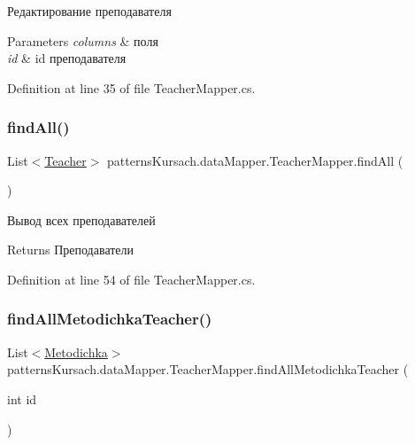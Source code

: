 Редактирование преподавателя 


\begin{DoxyParams}{Parameters}
{\em columns} & поля\\
\hline
{\em id} & id преподавателя\\
\hline
\end{DoxyParams}


Definition at line 35 of file Teacher\+Mapper.\+cs.

\mbox{\label{classpatterns_kursach_1_1data_mapper_1_1_teacher_mapper_ab8781a447f8b22a0ed6a5c52220465be}} 
\subsubsection{\texorpdfstring{find\+All()}{findAll()}}
{\footnotesize\ttfamily List$<$\mbox{\hyperlink{classpatterns_kursach_1_1_teacher}{Teacher}}$>$ patterns\+Kursach.\+data\+Mapper.\+Teacher\+Mapper.\+find\+All (\begin{DoxyParamCaption}{ }\end{DoxyParamCaption})}



Вывод всех преподавателей 

\begin{DoxyReturn}{Returns}
Преподаватели
\end{DoxyReturn}


Definition at line 54 of file Teacher\+Mapper.\+cs.

\mbox{\label{classpatterns_kursach_1_1data_mapper_1_1_teacher_mapper_ab481eae3c59669cdc4e2c51bf25676bb}} 
\subsubsection{\texorpdfstring{find\+All\+Metodichka\+Teacher()}{findAllMetodichkaTeacher()}}
{\footnotesize\ttfamily List$<$\mbox{\hyperlink{classpatterns_kursach_1_1_metodichka}{Metodichka}}$>$ patterns\+Kursach.\+data\+Mapper.\+Teacher\+Mapper.\+find\+All\+Metodichka\+Teacher (\begin{DoxyParamCaption}\item[{int}]{id }\end{DoxyParamCaption})}



